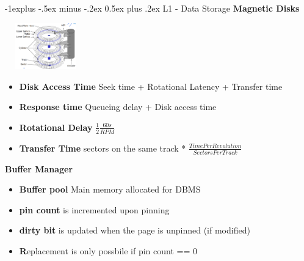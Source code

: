 \documentclass[10pt, landscape]{article}
\makeatletter
\renewcommand{\subsection}{\@startsection{subsection}{2}{0mm}%
                                {-1explus -.5ex minus -.2ex}%
                                {0.5ex plus .2ex}%
                                {\normalfont\normalsize\bfseries}}
\makeatother
\begin{document}
\raggedright
\footnotesize
\begin{multicols}{4}


\setlength{\columnseprule}{0.25pt}
\setlength{\premulticols}{1pt}
\setlength{\postmulticols}{1pt}
\setlength{\multicolsep}{1pt}
\setlength{\columnsep}{2pt}

\begin{center}
\end{center}

\subsection{L1 - Data Storage}
\textbf{Magnetic Disks} \newline

\includegraphics[width=3.5cm, height =2cm]{magnetic_disk.png}

\begin{itemize}
    \item \textbf{Disk Access Time} Seek time + Rotational Latency + Transfer time
    \item \textbf{Response time} Queueing delay + Disk access time
    \item \textbf{Rotational Delay} $\frac{1}{2} \frac{60s}{RPM}$ 
    \item \textbf{Transfer Time} sectors on the same track * $\tfrac{Time Per Revolution}{Sectors Per Track}$
\end{itemize}

\textbf{Buffer Manager}
\begin{itemize}
  \item \textbf{Buffer pool} Main memory allocated for DBMS
  \item \textbf{pin count} is incremented upon pinning
  \item \textbf{dirty bit} is updated when the page is unpinned (if modified)
  \item \textbf Replacement is only possbile if pin count == 0 
\end{itemize}


\end{multicols}
\end{document}
